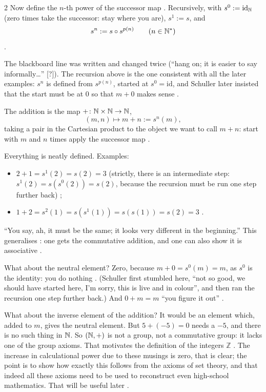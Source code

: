 \begin{paracol}{2}
Now define the $n$-th power of the successor map . Recursively, with $s^0:=\mathrm{id}_{\mathbb{N}}$
(zero times take the successor: stay where you are), $s^1:=s$, and
\[
  s^n:=s\circ s^{p(n)}\qquad(n\in\mathbb{N}^*)
\]
.
\begin{coursenote}
The blackboard line was written and changed twice (``hang on; it is easier to say informally\dots'' [?]). The recursion above is
the one consistent with all the later examples: $s^n$ is defined from $s^{p(n)}$, started at $s^0=\mathrm{id}$, and
Schuller later insisted that the start must be at $0$ so that $m+0$ makes sense .
\end{coursenote}

\begin{definition}\label{def:cl-addN}
The addition is the map $+\colon\mathbb{N}\times\mathbb{N}\to\mathbb{N}$,
\[
  (m,n)\mapsto m+n:=s^n(m),
\]
taking a pair in the Cartesian product to the object we want to call $m+n$: start with $m$ and $n$ times apply the
successor map .
\end{definition}
Everything is neatly defined. Examples:
\begin{itemize}
  \item $2+1=s^1(2)=s(2)=3$ (strictly, there is an intermediate step: $s^1(2)=s(s^0(2))=s(2)$, because the recursion must
        be run one step further back) ;
  \item $1+2=s^2(1)=s(s^1(1))=s(s(1))=s(2)=3$ .
\end{itemize}
``You say, ah, it must be the same; it looks very different in the beginning.'' This generalises : one gets the
commutative addition, and one can also show it is associative .

What about the neutral element? Zero, because $m+0=s^0(m)=m$, as $s^0$ is the identity: you do nothing
. (Schuller first stumbled here, ``not so
good, we should have started here, I'm sorry, this is live and in colour'', and then ran the recursion one step further
back.) And $0+m=m$ ``you figure it out'' .

What about the inverse element of the addition? It would be an element which, added to $m$, gives the neutral element. But
$5+(-5)=0$ needs a $-5$, and there is no such thing in $\mathbb{N}$. So $(\mathbb{N},+)$ is not a group, not a commutative group: it lacks one
of the group axioms. That motivates the definition of the integers $\mathbb Z$ . The
increase in calculational power due to these musings is zero, that is clear; the point is to show how exactly this follows
from the axioms of set theory, and that indeed all these axioms need to be used to reconstruct even high-school mathematics.
That will be useful later .


\end{paracol}

